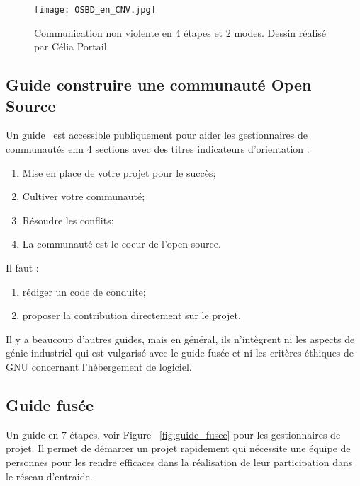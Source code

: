 \begin{figure}[htb]
\centering
\texttt{[image: OSBD\_en\_CNV.jpg]}
\caption{Communication non violente en 4 étapes et 2 modes. Dessin réalisé par Célia Portail~\cite{wikipedia_image_non_violente}}
\label{fig:communication_non_violente}
\end{figure}

\subsection{Guide construire une communauté Open Source}

Un guide~\cite{url_open_source_guide} est accessible publiquement pour aider les gestionnaires de communautés enn 4 sections avec des titres indicateurs d’orientation :

\begin{enumerate}
    \item Mise en place de votre projet pour le succès;
    \item Cultiver votre communauté;
    \item Résoudre les conflits;
    \item La communauté est le coeur de l’open source.
\end{enumerate}

Il faut :
\begin{enumerate}
    \item rédiger un code de conduite;
    \item proposer la contribution directement sur le projet.
\end{enumerate}

Il y a beaucoup d'autres guides, mais en général, ils n'intègrent ni les aspects de génie industriel qui est vulgarisé avec le guide fusée et ni les critères éthiques de GNU concernant l’hébergement de logiciel.

\subsection{Guide fusée}

Un guide en 7 étapes, voir Figure ~\ref{fig:guide_fusee} pour les gestionnaires de projet. Il permet de démarrer un projet rapidement qui nécessite une équipe de personnes pour les rendre efficaces dans la réalisation de leur participation dans le réseau d’entraide.

